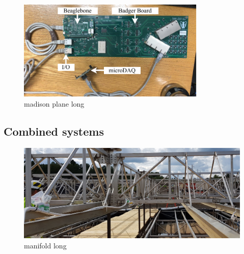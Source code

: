 \begin{figure} %
    \includegraphics[width=0.8\textwidth]{diagrams/5-daq/madison_plane.pdf}
    \caption[madison plane short]
    {madison plane long}

    \label{fig:madison_plane}
\end{figure}

\subsection{Combined systems} %
\label{sec:daq_hard_combined} %

\begin{figure} %
    \includegraphics[width=\textwidth]{diagrams/5-daq/manifold.jpg}
    \caption[manifold short]
    {manifold long}
    \label{fig:manifold}
\end{figure}


